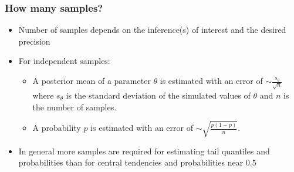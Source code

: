 \documentclass[handout]{beamer}
\begin{document}
\begin{frame}
  \frametitle{How many samples?}
  
\begin{itemize}
\item Number of samples depends on the inference(s) of interest and the desired precision
\item For independent samples:
\begin{itemize}
\item A posterior mean of a parameter $\theta$ is estimated with an error of $\sim \frac{s_\theta}{\sqrt{n}}$ where $s_\theta$ is the standard deviation of the simulated values of $\theta$ and $n$ is the number of samples.
\item A probability $p$ is estimated with an error of $\sim \sqrt{\frac{p(1-p)}{n}}$.
\end{itemize}
\item In general more samples are required for estimating tail quantiles and probabilities than for central tendencies and probabilities near 0.5
\end{itemize}

\end{frame}
\end{document}
